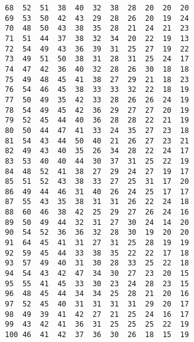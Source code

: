 \begin{lstlisting}
68	52	51	38	40	32	38	28	20	20	20
69	53	50	42	43	29	28	26	20	19	24
70	48	50	43	38	35	28	21	24	21	23
71	51	44	37	38	32	34	20	22	19	13
72	54	49	43	36	39	31	25	27	19	22
73	49	51	50	38	31	28	31	25	24	17
74	47	42	36	40	32	28	26	30	18	18
75	49	48	45	41	38	27	29	21	18	23
76	54	46	45	38	33	33	32	22	18	19
77	50	49	35	42	33	28	26	26	24	19
78	54	49	45	42	36	29	27	27	20	19
79	52	45	44	40	36	28	28	22	21	19
80	50	44	47	41	33	24	35	27	23	18
81	54	43	44	50	40	21	26	27	23	21
82	49	43	40	35	26	34	28	22	24	17
83	53	40	40	44	30	37	31	25	22	19
84	48	52	41	38	27	29	24	27	19	17
85	51	52	43	38	33	27	25	31	17	20
86	49	44	46	31	40	26	24	25	17	17
87	55	43	35	38	31	31	26	22	24	18
88	60	46	38	42	25	29	27	26	24	16
89	50	49	44	32	31	27	30	24	14	20
90	54	52	36	36	32	28	30	19	20	20
91	64	45	41	31	27	31	25	28	19	19
92	59	45	44	33	38	35	22	22	17	18
93	57	49	40	31	30	28	33	25	22	18
94	54	43	42	47	34	30	27	23	20	15
95	55	41	45	33	30	23	24	28	23	15
96	48	45	44	34	34	25	28	21	20	16
97	52	45	40	31	31	31	31	29	20	17
98	49	39	41	42	27	21	25	24	16	17
99	43	42	41	36	31	25	25	25	22	19
100	46	41	42	37	36	30	26	18	15	19
\end{lstlisting}